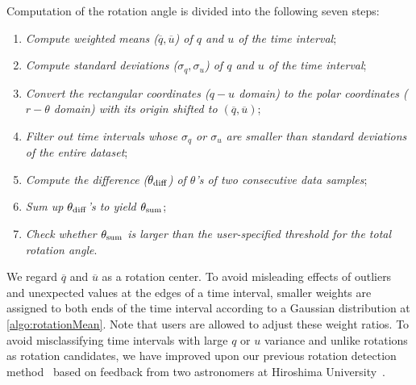 Computation of the rotation angle is divided into the following seven steps:
\begin{enumerate}[nosep, label=\textsl{Step \arabic*}, align=parleft, leftmargin=*]
    \item \textsl{Compute weighted means ($\overline{q}, \overline{u}$) of $q$ and $u$ of the time interval};\label{algo:rotationMean}
    \item \textsl{Compute standard deviations ($\sigma_{q}, \sigma_{u}$) of $q$ and $u$ of the time interval}; \label{algo:rotationStd}
    \item \textsl{Convert the rectangular coordinates ($q-u$ domain) to the polar coordinates ($r - \theta$ domain) with its origin shifted to $(\overline{q}, \overline{u})$}; \label{algo:rotationPolar}
    \item \textsl{Filter out time intervals whose $\sigma_{q}$ or $\sigma_{u}$ are smaller than standard deviations of the entire dataset}; \label{algo:rotationFilter}
    \item \textsl{Compute the difference ($\theta_{\rm diff}$) of $\theta$'s of two consecutive data samples}; \label{algo:rotationDiff}
    \item \textsl{Sum up $\theta_{\rm diff}$'s to yield $\theta_{\rm sum}$}; \label{algo:rotationSum}
    \item \textsl{Check whether $\theta_{\rm sum}$ is larger than the user-specified threshold for the total rotation angle}. \label{algo:rotationThreshold}
\end{enumerate}
We regard $\overline{q}$ and $\overline{u}$ as a rotation center. 
To avoid misleading effects of outliers and unexpected values at the edges of a time interval,
smaller weights are assigned to both ends of the time interval according to a Gaussian distribution at \ref{algo:rotationMean}.
Note that users are allowed to adjust these weight ratios.
%
To avoid misclassifying time intervals with large $q$ or $u$ variance and unlike rotations as rotation candidates,
we have improved upon our previous rotation detection method~\cite{Sawada2018} based on feedback from two astronomers at Hiroshima University~\cite{Huang2019}.
%
